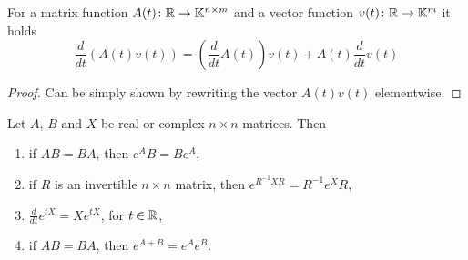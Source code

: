 \begin{lemma}
\label{lem:matrixTimesVectorDerivative}
	For a matrix function $A(t)\colon\mathbb{R}\to\mathbb{K}^{n\times m}$ and a vector function \linebreak $v(t)\colon\mathbb{R}\to\mathbb{K}^m$ it holds 
	$$\frac{d}{dt}\left(A(t)v(t)\right)=\left(\frac{d}{dt}A(t)\right)v(t)+A(t)\frac{d}{dt}v(t)$$
\end{lemma}
	
\begin{proof}
	Can be simply shown by rewriting the vector $A(t)v(t)$ elementwise.
\end{proof}

\begin{lemma}
\label{lem:expprop}
	Let $A$, $B$ and $X$ be real or complex $n\times n$ matrices. Then 
	\begin{enumerate}
		\item if $AB = BA$, then $e^{A}B = Be^{A}$,
		\item if $R$ is an invertible $n\times n$ matrix, then $e^{R^{-1}XR}=R^{-1}e^XR$,
		\item $\frac{d}{dt}e^{tX}=Xe^{tX}$, for $t \in \mathbb{R}$,
		\item if $AB = BA$, then $e^{A+B} = e^{A}e^B$.
	\end{enumerate}
\end{lemma}


